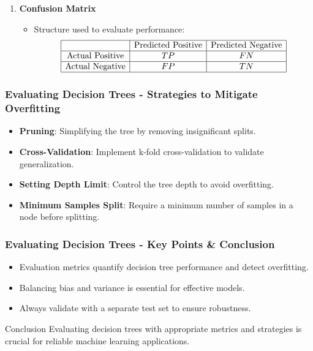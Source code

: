 \documentclass[aspectratio=169]{beamer}
\begin{document}
\begin{frame}[fragile]
\begin{enumerate}
        \item \textbf{Confusion Matrix}
        \begin{itemize}
            \item Structure used to evaluate performance:
            \[
            \begin{array}{|c|c|c|}
            \hline
            & \text{Predicted Positive} & \text{Predicted Negative} \\
            \hline
            \text{Actual Positive} & TP & FN \\
            \hline
            \text{Actual Negative} & FP & TN \\
            \hline
            \end{array}
            \]
        \end{itemize}
    \end{enumerate}
\end{frame}

\begin{frame}[fragile]
    \frametitle{Evaluating Decision Trees - Strategies to Mitigate Overfitting}
    \begin{itemize}
        \item \textbf{Pruning}: Simplifying the tree by removing insignificant splits.
        \item \textbf{Cross-Validation}: Implement k-fold cross-validation to validate generalization.
        \item \textbf{Setting Depth Limit}: Control the tree depth to avoid overfitting.
        \item \textbf{Minimum Samples Split}: Require a minimum number of samples in a node before splitting.
    \end{itemize}
\end{frame}

\begin{frame}[fragile]
    \frametitle{Evaluating Decision Trees - Key Points & Conclusion}
    \begin{itemize}
        \item Evaluation metrics quantify decision tree performance and detect overfitting.
        \item Balancing bias and variance is essential for effective models.
        \item Always validate with a separate test set to ensure robustness.
    \end{itemize}
    \begin{block}{Conclusion}
        Evaluating decision trees with appropriate metrics and strategies is crucial for reliable machine learning applications.
    \end{block}
\end{frame}
\end{document}
